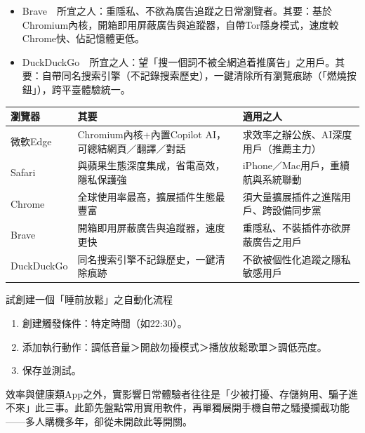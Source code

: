 
\begin{itemize}
  \item Brave　所宜之人：重隱私、不欲為廣告追蹤之日常瀏覽者。其要：基於Chromium內核，開箱即用屏蔽廣告與追蹤器，自帶Tor隱身模式，速度較Chrome快、佔記憶體更低。
  \item DuckDuckGo　所宜之人：望「搜一個詞不被全網追着推廣告」之用戶。其要：自帶同名搜索引擎（不記錄搜索歷史），一鍵清除所有瀏覽痕跡（「燃燒按鈕」），跨平臺體驗統一。
\end{itemize}


\begin{center}
\begin{tabularx}{\linewidth}{|X|X|X|}
\hline
\textbf{瀏覽器} & \textbf{其要} & \textbf{適用之人} \tabularnewline
\hline
微軟Edge & Chromium內核+內置Copilot AI，可總結網頁／翻譯／對話 & 求效率之辦公族、AI深度用戶（推薦主力） \tabularnewline
Safari & 與蘋果生態深度集成，省電高效，隱私保護強 & iPhone／Mac用戶，重續航與系統聯動 \tabularnewline
Chrome & 全球使用率最高，擴展插件生態最豐富 & 須大量擴展插件之進階用戶、跨設備同步黨 \tabularnewline
Brave & 開箱即用屏蔽廣告與追蹤器，速度更快 & 重隱私、不裝插件亦欲屏蔽廣告之用戶 \tabularnewline
DuckDuckGo & 同名搜索引擎不記錄歷史，一鍵清除痕跡 & 不欲被個性化追蹤之隱私敏感用戶 \tabularnewline
\hline
\end{tabularx}
\end{center}

\begin{tcbpractice}{試創建一個「睡前放鬆」之自動化流程}
\begin{enumerate}
  \item 創建觸發條件：特定時間（如22:30）。
  \item 添加執行動作：調低音量＞開啟勿擾模式＞播放放鬆歌單＞調低亮度。
  \item 保存並測試。
\end{enumerate}

\end{tcbpractice}


效率與健康類App之外，實影響日常體驗者往往是「少被打擾、存儲夠用、騙子進不來」此三事。此節先盤點常用實用軟件，再單獨展開手機自帶之騷擾攔截功能——多人購機多年，卻從未開啟此等開關。


